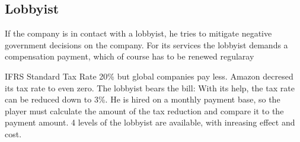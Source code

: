 \subsection{Lobbyist}
If the company is in contact with a lobbyist, he tries to mitigate negative government decisions on the company. For its services the lobbyist demands a compensation payment, which of course has to be renewed regularay


IFRS Standard Tax Rate 20\% but global companies pay less. Amazon decresed its tax rate to even zero. The lobbyist bears the bill: With its help, the tax rate can be reduced down to 3\%. He is hired on a monthly payment base, so the player must calculate the amount of the tax reduction and compare it to the payment amount. 4 levels of the lobbyist are available, with inreasing effect and cost. 

